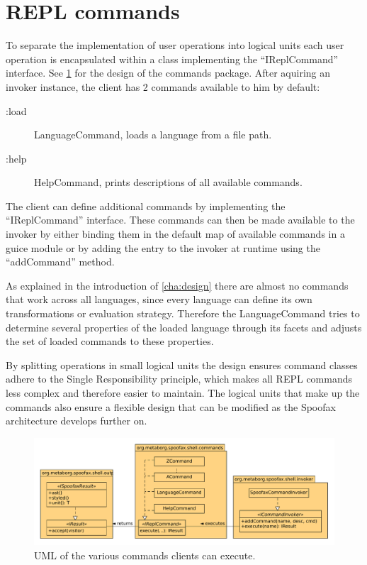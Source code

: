 \section{REPL commands}
\label{sec:commands}

To separate the implementation of user operations into logical units each user
operation is encapsulated within a class implementing the ``IReplCommand''
interface. See \cref{fig:uml-commands} for the design of the commands package.
After aquiring an invoker instance, the client has 2 commands available to him
by default:

\begin{description}
  \item [:load] LanguageCommand, loads a language from a file path.
  \item [:help] HelpCommand, prints descriptions of all available commands.
\end{description}

The client can define additional commands by implementing the ``IReplCommand''
interface. These commands can then be made available to the invoker by either
binding them in the default map of available commands in a guice module or by
adding the entry to the invoker at runtime using the ``addCommand'' method.

As explained in the introduction of \cref{cha:design} there are almost no
commands that work across all languages, since every language can define its
own transformations or evaluation strategy. Therefore the LanguageCommand tries
to determine several properties of the loaded language through its facets and
adjusts the set of loaded commands to these properties.

By splitting operations in small logical units the design ensures command
classes adhere to the Single Responsibility principle, which makes all REPL
commands less complex and therefore easier to maintain. The logical units that
make up the commands also ensure a flexible design that can be modified
as the Spoofax architecture develops further on.

\begin{figure}[h]
  \centering
  \includegraphics[width=\textwidth]{uml-commands}
  \caption{UML of the various commands clients can execute.}
  \label{fig:uml-commands}
\end{figure}

